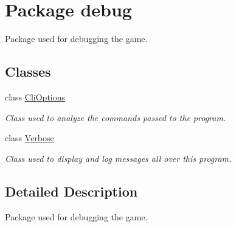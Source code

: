 \hypertarget{a00080}{\section{Package debug}
\label{a00080}
}


Package used for debugging the game.  


\subsection*{Classes}
\begin{DoxyCompactItemize}
\item 
class \hyperlink{a00006}{Cli\-Options}
\begin{DoxyCompactList}\small\item\em Class used to analyze the commands passed to the program. \end{DoxyCompactList}\item 
class \hyperlink{a00035}{Verbose}
\begin{DoxyCompactList}\small\item\em Class used to display and log messages all over this program. \end{DoxyCompactList}\end{DoxyCompactItemize}


\subsection{Detailed Description}
Package used for debugging the game. 